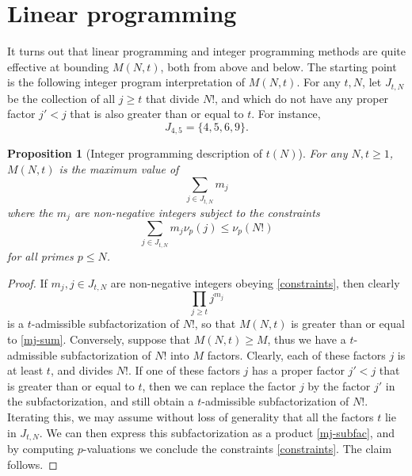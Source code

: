\documentclass[10pt,a4paper,reqno]{amsart}
\numberwithin{equation}{section}
\theoremstyle{plain}
\newtheorem{proposition}[theorem]{Proposition}
\theoremstyle{definition}
\begin{document}
\begin{table}[htp!]
\caption{For sample values of $N \in [10^5, 10^9]$, the performance of the fast greedy algorithm (using heuristically chosen $t\in [t_0(N),t_1(N)]$), and the standard greedy algorithm (using  exhaustively computed $t_1(N)$), compared against the lower bound $t(N)_-$ obtained from the linear programming method of . All computations were performed on an Intel i9-13900KS CPU with 24 cores. The fast heuristic computations were single-threaded computations, while exhaustive greedy computations used 32 threads running on 24 cores.}\label{greedy-table}
\end{table}

\section{Linear programming}\label{linprog-sec}

It turns out that linear programming and integer programming methods are quite effective at bounding $M(N,t)$, both from above and below.  The starting point is the following integer program interpretation of $M(N,t)$. For any $t,N$, let $J_{t,N}$ be the collection of all $j \geq t$ that divide $N!$, and which do not have any proper factor $j' < j$ that is also greater than or equal to $t$.  For instance,
$$ J_{4,5} = \{ 4, 5, 6, 9 \}.$$ 

\begin{proposition}[Integer programming description of $t(N)$]\label{fip}  For any $N,t \geq 1$, $M(N,t)$ is the maximum value of
\begin{equation}\label{mj-sum}
   \sum_{j \in J_{t,N}} m_j
\end{equation}
where the $m_j$ are non-negative integers subject to the constraints
\begin{equation}\label{constraints}
  \sum_{j \in J_{t,N}} m_j \nu_p(j) \leq \nu_p(N!)
\end{equation}
for all primes $p \leq N$.
\end{proposition}

\begin{proof}  If $m_j, j \in J_{t,N}$ are non-negative integers obeying \eqref{constraints}, then clearly
  \begin{equation}\label{mj-subfac} 
    \prod_{j \geq t} j^{m_j}
  \end{equation}
is a $t$-admissible subfactorization of $N!$, so that $M(N,t)$ is greater than or equal to \eqref{mj-sum}. Conversely, suppose that $M(N,t) \geq M$, thus we have a $t$-admissible subfactorization of $N!$ into $M$ factors.  Clearly, each of these factors $j$ is at least $t$, and divides $N!$.
If one of these factors $j$ has a proper factor $j' < j$ that is greater than or equal to $t$, then we can replace the factor $j$ by the factor $j'$ in the subfactorization, and still obtain a $t$-admissible subfactorization of $N!$.  Iterating this, we may assume without loss of generality that all the factors $t$ lie in $J_{t,N}$.  We can then express this subfactorization as a product \eqref{mj-subfac}, and by computing $p$-valuations we conclude the constraints \eqref{constraints}.  The claim follows.
\end{proof}
\end{document}
